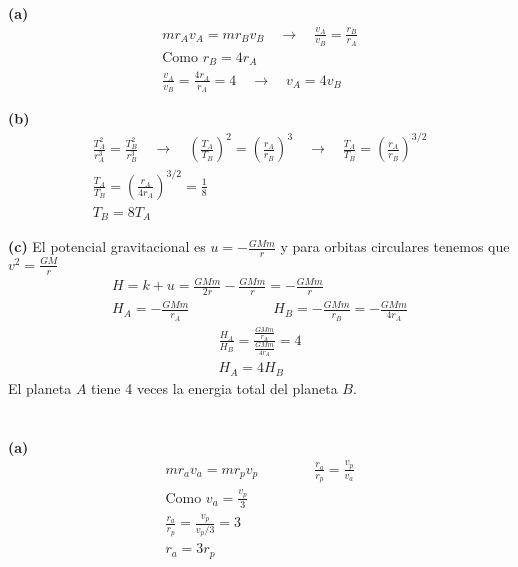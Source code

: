 \documentclass{article}
\begin{document}
\section{}

\hfill 

\textbf{(a)} 
\begin{gather*}
  m r_A v_A = m r_B v_B \quad \rightarrow \quad \frac{v_A }{v_B } = \frac{r_B }{r_A } \\
  \text{Como } r_B = 4r_A  \\ 
  \frac{v_A }{v_B } = \frac{4 r_A }{r_A } = 4 \quad \rightarrow \quad v_A = 4v_B
\end{gather*}

\hfill 

\textbf{(b)} 
\begin{gather*}
  \frac{T_A^2 }{r_A^3 } = \frac{T_B^2 }{r_B^3 } \quad \rightarrow \quad \left(\frac{T_A }{T_B }\right) ^2 = \left(\frac{r_A }{r_B }\right) ^ {3 } \quad \rightarrow \quad  \frac{T_A }{T_B }  = \left(\frac{r_A }{r_B }\right) ^ {3/2 } \\ 
  \frac{T_A }{T_B }  = \left(\frac{r_A }{4r_A }\right) ^ {3/2 } = \frac{1}{8} \\
  T_B = 8T_A
\end{gather*}

\hfill 

\textbf{(c) } El potencial gravitacional es $  u = - \frac{GMm }{r } $ y para orbitas circulares tenemos que $ v^2 = \frac{GM }{r } $
\begin{gather*}
  H = k+u = \frac{GMm }{2r } - \frac{GMm }{r } = - \frac{GMm }{r } \\
  H_A = -\frac{GMm }{r_A }  \qquad \qquad \qquad H_B = - \frac{GMm }{r_B } = - \frac{GMm }{4r_A}
\end{gather*}
\begin{gather*}
  \frac{H_A }{H_B } = \frac{\frac{GMm }{r_A }}{\frac{GMm }{4r_A }} =4\\
  H_A = 4H_B
\end{gather*}
El planeta $ A  $ tiene 4 veces la energia total del planeta $ B  $.

\section{}

\hfill 

\textbf{(a)} 
\begin{gather*}
  m r_a v_a = m r_p v_p \qquad \qquad \frac{r_a }{r_p } = \frac{v_p }{v_a }\\
  \text{Como } v_a = \frac{v_p }{3 }\\
  \frac{r_a }{r_p } = \frac{v_p }{v_p/3 } = 3 \\
  r_a = 3 r_p 
\end{gather*}
\end{document}
